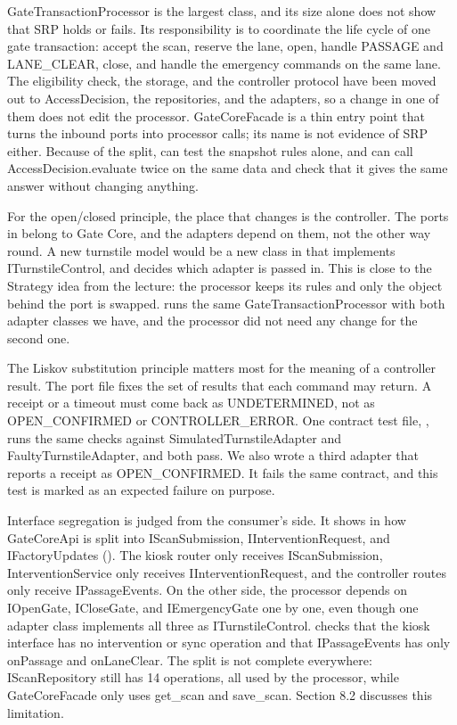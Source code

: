GateTransactionProcessor is the largest class, and its size alone does not show that SRP holds or fails. Its responsibility is to coordinate the life cycle of one gate transaction: accept the scan, reserve the lane, open, handle PASSAGE and LANE\_CLEAR, close, and handle the emergency commands on the same lane. The eligibility check, the storage, and the controller protocol have been moved out to AccessDecision, the repositories, and the adapters, so a change in one of them does not edit the processor. GateCoreFacade is a thin entry point that turns the inbound ports into processor calls; its name is not evidence of SRP either. Because of the split,  can test the snapshot rules alone, and  can call AccessDecision.evaluate twice on the same data and check that it gives the same answer without changing anything.

For the open/closed principle, the place that changes is the controller. The ports in  belong to Gate Core, and the adapters depend on them, not the other way round. A new turnstile model would be a new class in  that implements ITurnstileControl, and  decides which adapter is passed in. This is close to the Strategy idea from the lecture: the processor keeps its rules and only the object behind the port is swapped.  runs the same GateTransactionProcessor with both adapter classes we have, and the processor did not need any change for the second one.

The Liskov substitution principle matters most for the meaning of a controller result. The port file  fixes the set of results that each command may return. A receipt or a timeout must come back as UNDETERMINED, not as OPEN\_CONFIRMED or CONTROLLER\_ERROR. One contract test file, , runs the same checks against SimulatedTurnstileAdapter and FaultyTurnstileAdapter, and both pass. We also wrote a third adapter that reports a receipt as OPEN\_CONFIRMED. It fails the same contract, and this test is marked as an expected failure on purpose.

Interface segregation is judged from the consumer's side. It shows in how GateCoreApi is split into IScanSubmission, IInterventionRequest, and IFactoryUpdates (). The kiosk router only receives IScanSubmission, InterventionService only receives IInterventionRequest, and the controller routes only receive IPassageEvents. On the other side, the processor depends on IOpenGate, ICloseGate, and IEmergencyGate one by one, even though one adapter class implements all three as ITurnstileControl.  checks that the kiosk interface has no intervention or sync operation and that IPassageEvents has only onPassage and onLaneClear. The split is not complete everywhere: IScanRepository still has 14 operations, all used by the processor, while GateCoreFacade only uses get\_scan and save\_scan. Section 8.2 discusses this limitation.

